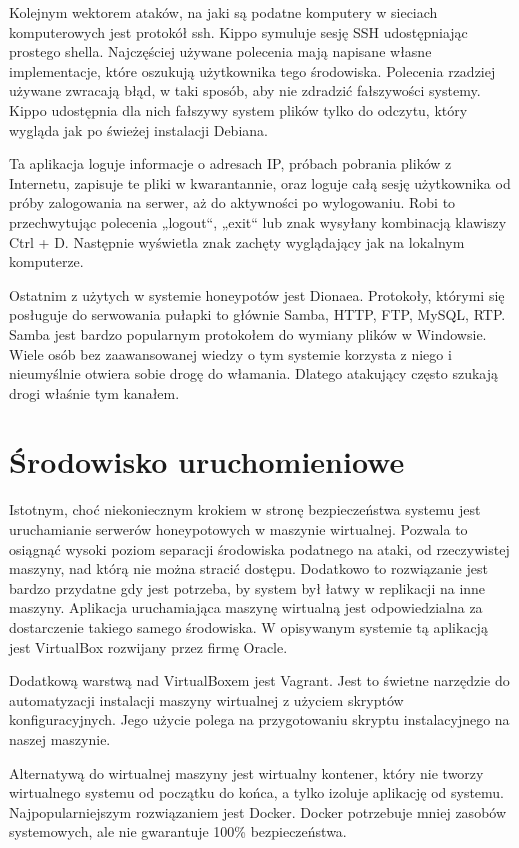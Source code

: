 \documentclass[runningheads,a4paper]{llncs}
\begin{document}
Kolejnym wektorem ataków, na jaki są podatne komputery w sieciach komputerowych jest protokół ssh. Kippo symuluje sesję SSH udostępniając prostego shella. Najczęściej używane polecenia mają napisane własne implementacje, które oszukują użytkownika tego środowiska. Polecenia rzadziej używane zwracają błąd, w taki sposób, aby nie zdradzić fałszywości systemy. Kippo udostępnia dla nich fałszywy system plików tylko do odczytu, który wygląda jak po świeżej instalacji Debiana.

Ta aplikacja loguje informacje o adresach IP, próbach pobrania plików z Internetu, zapisuje te pliki w kwarantannie, oraz loguje całą sesję użytkownika od próby zalogowania na serwer, aż do aktywności po wylogowaniu. Robi to przechwytując polecenia „logout“, „exit“ lub znak wysyłany kombinacją klawiszy Ctrl + D. Następnie wyświetla znak zachęty wyglądający jak na lokalnym komputerze.

Ostatnim z użytych w systemie honeypotów jest Dionaea. Protokoły, którymi się posługuje do serwowania pułapki to głównie Samba, HTTP, FTP, MySQL, RTP. Samba jest bardzo popularnym protokołem do wymiany plików w Windowsie. Wiele osób bez zaawansowanej wiedzy o tym systemie korzysta z niego i nieumyślnie otwiera sobie drogę do włamania. Dlatego atakujący często szukają drogi właśnie tym kanałem.

\section{Środowisko uruchomieniowe}

Istotnym, choć niekoniecznym krokiem w stronę bezpieczeństwa systemu jest uruchamianie serwerów honeypotowych w maszynie wirtualnej. Pozwala to osiągnąć wysoki poziom separacji środowiska podatnego na ataki, od rzeczywistej maszyny, nad którą nie można stracić dostępu. Dodatkowo to rozwiązanie jest bardzo przydatne gdy jest potrzeba, by system był łatwy w replikacji na inne maszyny. Aplikacja uruchamiająca maszynę wirtualną jest odpowiedzialna za dostarczenie takiego samego środowiska. W opisywanym systemie tą aplikacją jest VirtualBox rozwijany przez firmę Oracle.

Dodatkową warstwą nad VirtualBoxem jest Vagrant. Jest to świetne narzędzie do automatyzacji instalacji maszyny wirtualnej z użyciem skryptów konfiguracyjnych. Jego użycie polega na przygotowaniu skryptu instalacyjnego na naszej maszynie.

Alternatywą do wirtualnej maszyny jest wirtualny kontener, który nie tworzy wirtualnego systemu od początku do końca, a tylko izoluje aplikację od systemu. Najpopularniejszym rozwiązaniem jest Docker. Docker potrzebuje mniej zasobów systemowych, ale nie gwarantuje 100\% bezpieczeństwa.
\end{document}
